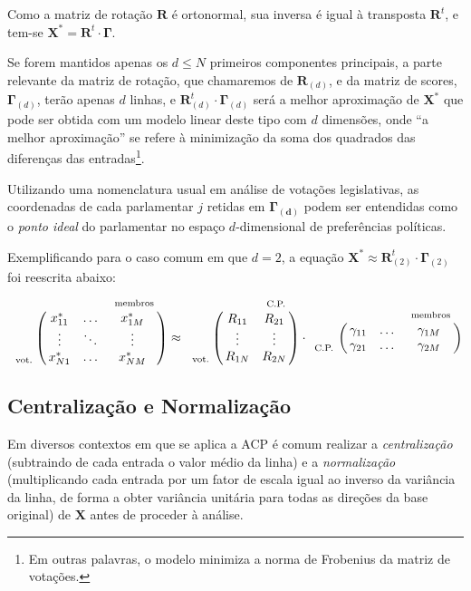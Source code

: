 \documentclass[a4paper, 12pt]{article}
\let\bbordermatrix\bordermatrix
\begin{document}

Como a matriz de rotação $\mathbf{R}$ é ortonormal, sua inversa é igual à transposta $\mathbf{R}^{t}$, e tem-se $\mathbf{X^{*}} = \mathbf{R}^t \cdot \mathbf{\Gamma}$.

Se forem mantidos apenas os $d \leq N$ primeiros componentes principais, a parte relevante da matriz de rotação, que chamaremos de $\mathbf{R}_{(d)}$, e da matriz de scores, $\mathbf{\Gamma}_{(d)}$, terão apenas $d$ linhas, e $\mathbf{R}_{(d)}^{t}\cdot \mathbf{\Gamma}_{(d)}$ será a melhor aproximação de $\mathbf{X^{*}}$ que pode ser obtida com um modelo linear deste tipo com $d$ dimensões, onde ``a melhor aproximação'' se refere à minimização da soma dos quadrados das diferenças das entradas\footnote{Em outras palavras, o modelo minimiza a norma de Frobenius da matriz de votações.}.

Utilizando uma nomenclatura usual em análise de votações legislativas, as coordenadas de cada parlamentar $j$ retidas em $\mathbf{\Gamma_{(d)}}$ podem ser entendidas como o \emph{ponto ideal} do parlamentar no espaço $d$-dimensional de preferências políticas.

Exemplificando para o caso comum em que $d=2$, a equação $\mathbf{X^{*}} \approx \mathbf{R}_{(2)}^{t} \cdot \mathbf{\Gamma}_{(2)}$ foi reescrita abaixo:
\[
  \bbordermatrix{~  & ~ & ~ & ~_\text{membros} \cr
                ~ & x^{*}_{11} & \ldots & x^{*}_{1M}   \cr
                ~ & \vdots & \ddots & \vdots  \cr
                ~_\text{vot.} & x^{*}_{N1} & \ldots & x^{*}_{NM}   \cr
                } \approx
  \bbordermatrix{~  & ~ & ~_\text{C.P.} \cr
                ~ & R_{11} & R_{21}   \cr
                ~ & \vdots & \vdots  \cr
                ~_\text{vot.} & R_{1N} & R_{2N} \cr
                } \cdot
  \bbordermatrix{~  & ~ & ~ & ~_\text{membros} \cr
                ~ & \gamma_{11} & \ldots & \gamma_{1M}   \cr
                ~_\text{C.P.} & \gamma_{21} & \ldots & \gamma_{2M}   \cr
                }
\]


\subsection*{Centralização e Normalização}

Em diversos contextos em que se aplica a ACP é comum realizar a \emph{centralização} (subtraindo de cada entrada o valor médio da linha) e a \emph{normalização} (multiplicando cada entrada por um fator de escala igual ao inverso da variância da linha, de forma a obter variância unitária para todas as direções da base original) de $\mathbf{X}$ antes de proceder à análise.
\end{document}
